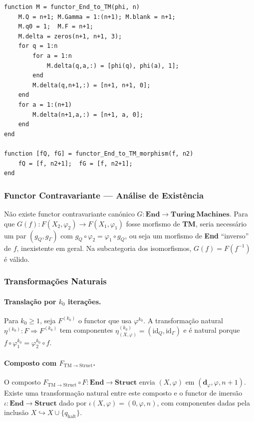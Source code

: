 \begin{lstlisting}[style=matlab, caption={Functor covariante $F: \mathbf{End} \to \mathbf{Turing\ Machines}$}]
function M = functor_End_to_TM(phi, n)
    M.Q = n+1; M.Gamma = 1:(n+1); M.blank = n+1;
    M.q0 = 1;  M.F = n+1;
    M.delta = zeros(n+1, n+1, 3);
    for q = 1:n
        for a = 1:n
            M.delta(q,a,:) = [phi(q), phi(a), 1];
        end
        M.delta(q,n+1,:) = [n+1, n+1, 0];
    end
    for a = 1:(n+1)
        M.delta(n+1,a,:) = [n+1, a, 0];
    end
end

function [fQ, fG] = functor_End_to_TM_morphism(f, n2)
    fQ = [f, n2+1];  fG = [f, n2+1];
end
\end{lstlisting}

\subsubsection{Functor Contravariante --- Análise de Existência}

\begin{proposition}
Não existe functor contravariante canónico $G: \mathbf{End} \to \mathbf{Turing\ Machines}$. Para que $G(f): F(X_2,\varphi_2) \to F(X_1,\varphi_1)$ fosse morfismo de \textbf{TM}, seria necessário um par $(g_Q, g_\Gamma)$ com $g_Q \circ \varphi_2 = \varphi_1 \circ g_Q$, ou seja um morfismo de \textbf{End} ``inverso'' de $f$, inexistente em geral. Na subcategoria dos isomorfismos, $G(f) = F(f^{-1})$ é válido.
\end{proposition}
 
 \subsubsection{Transformações Naturais}

\paragraph{Translação por $k_0$ iterações.}
Para $k_0 \geq 1$, seja $F^{(k_0)}$ o functor que usa $\varphi^{k_0}$. A transformação natural $\eta^{(k_0)}: F \Rightarrow F^{(k_0)}$ tem componentes $\eta^{(k_0)}_{(X,\varphi)} = (\mathrm{id}_Q, \mathrm{id}_\Gamma)$ e é natural porque $f \circ \varphi_1^{k_0} = \varphi_2^{k_0} \circ f$.

\paragraph{Composto com $F_{\mathrm{TM}\to\mathrm{Struct}}$.}
O composto $F_{\mathrm{TM}\to\mathrm{Struct}} \circ F: \mathbf{End} \to \mathbf{Struct}$ envia $(X,\varphi)$ em $(\mathbf{d}_\varphi, \varphi, n{+}1)$. Existe uma transformação natural entre este composto e o functor de imersão $\iota: \mathbf{End} \to \mathbf{Struct}$ dado por $\iota(X,\varphi) = (0, \varphi, n)$, com componentes dadas pela inclusão $X \hookrightarrow X \cup \{q_{\mathrm{halt}}\}$.

